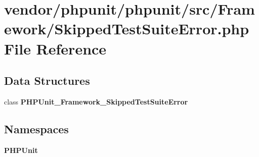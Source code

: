 \section{vendor/phpunit/phpunit/src/\+Framework/\+Skipped\+Test\+Suite\+Error.php File Reference}
\label{_skipped_test_suite_error_8php}
\subsection*{Data Structures}
\begin{DoxyCompactItemize}
\item 
class {\bf P\+H\+P\+Unit\+\_\+\+Framework\+\_\+\+Skipped\+Test\+Suite\+Error}
\end{DoxyCompactItemize}
\subsection*{Namespaces}
\begin{DoxyCompactItemize}
\item 
 {\bf P\+H\+P\+Unit}
\end{DoxyCompactItemize}
